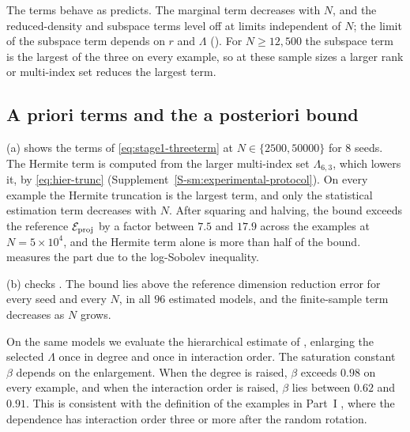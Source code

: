 \documentclass[review,hidelinks,onefignum,onetabnum]{siamart251216}
\begin{document}
The terms behave as  predicts. The marginal term decreases with $N$, and the reduced-density and subspace terms level off at limits independent of $N$; the limit of the subspace term depends on $r$ and $\Lambda$ (). For $N \ge 12{,}500$ the subspace term is the largest of the three on every example, so at these sample sizes a larger rank or multi-index set reduces the largest term.

\subsection{A priori terms and the a posteriori bound}
\label{sec:exp-aposteriori}

(a) shows the terms of \eqref{eq:stage1-threeterm} at $N \in \{2500, 50000\}$ for $8$ seeds. The Hermite term is computed from the larger multi-index set $\Lambda_{6,3}$, which lowers it, by \eqref{eq:hier-trunc} (Supplement~\ref{S-sm:experimental-protocol}). On every example the Hermite truncation is the largest term, and only the statistical estimation term decreases with $N$. After squaring and halving, the bound exceeds the reference $\mathcal E_{\rm proj}$ by a factor between $7.5$ and $17.9$ across the examples at $N = 5\times10^4$, and the Hermite term alone is more than half of the bound.  measures the part due to the log-Sobolev inequality.

(b) checks . The bound lies above the reference dimension reduction error for every seed and every $N$, in all $96$ estimated models, and the finite-sample term decreases as $N$ grows.

On the same models we evaluate the hierarchical estimate of , enlarging the selected $\Lambda$ once in degree and once in interaction order. The saturation constant $\beta$ depends on the enlargement. When the degree is raised, $\beta$ exceeds $0.98$ on every example, and when the interaction order is raised, $\beta$ lies between $0.62$ and $0.91$. This is consistent with the definition of the examples in Part~I \cite{CAS_partI}, where the dependence has interaction order three or more after the random rotation.
\end{document}
